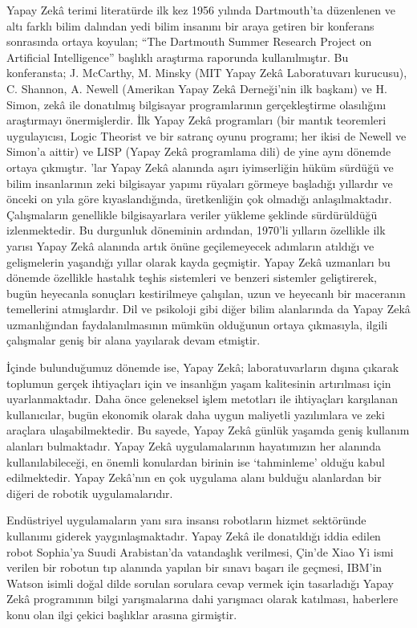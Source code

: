\documentclass{article}
\begin{document}
\begin{multicols}{2}

Yapay Zekâ terimi literatürde ilk kez 1956 yılında Dartmouth’ta düzenlenen ve
altı farklı bilim dalından yedi bilim insanını bir araya getiren bir konferans sonrasında ortaya koyulan; “The Dartmouth Summer Research Project on Artificial Intelligence” başlıklı araştırma raporunda kullanılmıştır. Bu konferansta; J. McCarthy, M. Minsky (MIT Yapay Zekâ Laboratuvarı kurucusu), C. Shannon, A. Newell
(Amerikan Yapay Zekâ Derneği’nin ilk başkanı) ve H. Simon, zekâ ile donatılmış
bilgisayar programlarının gerçekleştirme olasılığını araştırmayı önermişlerdir.
İlk Yapay Zekâ programları (bir mantık teoremleri uygulayıcısı, Logic Theorist
ve bir satranç oyunu programı; her ikisi de Newell ve Simon’a aittir) ve LISP
(Yapay Zekâ programlama dili) de yine aynı dönemde ortaya çıkmıştır.
’lar Yapay Zekâ alanında aşırı iyimserliğin hüküm sürdüğü ve bilim insanlarının zeki bilgisayar yapımı rüyaları görmeye başladığı yıllardır ve önceki on yıla
göre kıyaslandığında, üretkenliğin çok olmadığı anlaşılmaktadır. Çalışmaların
genellikle bilgisayarlara veriler yükleme şeklinde sürdürüldüğü izlenmektedir.
Bu durgunluk döneminin ardından, 1970’li yılların özellikle ilk yarısı Yapay Zekâ
alanında artık önüne geçilemeyecek adımların atıldığı ve gelişmelerin yaşandığı
yıllar olarak kayda geçmiştir. Yapay Zekâ uzmanları bu dönemde özellikle hastalık teşhis sistemleri ve benzeri sistemler geliştirerek, bugün heyecanla sonuçları
kestirilmeye çalışılan, uzun ve heyecanlı bir maceranın temellerini atmışlardır.
Dil ve psikoloji gibi diğer bilim alanlarında da Yapay Zekâ uzmanlığından faydalanılmasının mümkün olduğunun ortaya çıkmasıyla, ilgili çalışmalar geniş bir
alana yayılarak devam etmiştir.

İçinde bulunduğumuz dönemde ise, Yapay Zekâ; laboratuvarların dışına çıkarak
toplumun gerçek ihtiyaçları için ve insanlığın yaşam kalitesinin artırılması için
uyarlanmaktadır. Daha önce geleneksel işlem metotları ile ihtiyaçları karşılanan
kullanıcılar, bugün ekonomik olarak daha uygun maliyetli yazılımlara ve zeki araçlara ulaşabilmektedir. Bu sayede, Yapay Zekâ günlük yaşamda geniş kullanım alanları bulmaktadır. Yapay Zekâ uygulamalarının hayatımızın her alanında
kullanılabileceği, en önemli konulardan birinin ise ‘tahminleme’ olduğu kabul
edilmektedir. Yapay Zekâ’nın en çok uygulama alanı bulduğu alanlardan bir
diğeri de robotik uygulamalarıdır. 

Endüstriyel uygulamaların yanı sıra insansı
robotların hizmet sektöründe kullanımı giderek yaygınlaşmaktadır. Yapay Zekâ
ile donatıldığı iddia edilen robot Sophia’ya Suudi Arabistan’da vatandaşlık verilmesi, Çin’de Xiao Yi ismi verilen bir robotun tıp alanında yapılan bir sınavı
başarı ile geçmesi, IBM’in Watson isimli doğal dilde sorulan sorulara cevap vermek için tasarladığı Yapay Zekâ programının bilgi yarışmalarına dahi yarışmacı
olarak katılması, haberlere konu olan ilgi çekici başlıklar arasına girmiştir.



\end{multicols}
\end{document}
